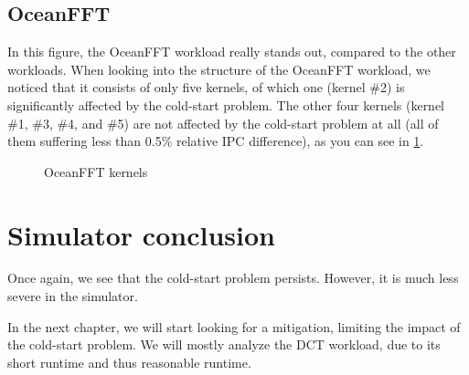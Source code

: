 \subsection{OceanFFT}\label{subsec:oceanfft}
In this figure, the OceanFFT workload really stands out, compared to the other workloads.
When looking into the structure of the OceanFFT workload, we noticed that it consists of only five kernels, of which one (kernel \#2) is significantly affected by the cold-start problem.
The other four kernels (kernel \#1, \#3, \#4, and \#5) are not affected by the cold-start problem at all (all of them suffering less than 0.5\% relative IPC difference), as you can see in \cref{fig:ocean_kernels}.

\begin{figure}[ht]
    \centering
    \caption{OceanFFT kernels}
    \label{fig:ocean_kernels}
\end{figure}

\FloatBarrier
\section{Simulator conclusion}\label{sec:simulator-conclusion}
Once again, we see that the cold-start problem persists.
However, it is much less severe in the simulator.

In the next chapter, we will start looking for a mitigation, limiting the impact of the cold-start problem.
We will mostly analyze the DCT workload, due to its short runtime and thus reasonable runtime.
